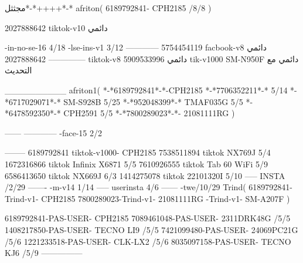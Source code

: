 مجثثل*-*++++*-*
afriton(
6189792841- CPH2185  /8/8
)

2027888642 tiktok-v10
دائمي

-in-no-se-16 4/18
-lse-ins-v1 3/12
------------
5754454119 facbook-v8
دائمي
--------------
2027888642 tiktok-v8
دائمي
5909533996 tik-v1000  SM-N950F
دائمي مع التحديث

__________
afriton1(
*-*6189792841*-*-CPH2185
*-*7706352211*-* 5/14
*-*6717029071*-*  SM-S928B 5/25
*-*952048399*-* TMAF035G 5/5
*-*6478592350*-* CPH2591 5/5
*-*7800289023*-*- 21081111RG \5\7
)


------
------------
-face-15 2/2

--------
6189792841 tiktok-v1000- CPH2185 
7538511894 tiktok NX769J  5/4
1672316866 tiktok Infinix X6871  5/5
7610926555 tiktok Tab 60 WiFi  5/9
6586413650 tiktok NX669J  6/3
1414275078 tiktok 22101320I  5/10
-----
 INSTA /2/29
-------
-m-v14 1/14
-----
userinsta 4/6
------
-twe/10/29
Trind(
6189792841-Trind-v1- CPH2185 
7800289023-Trind-v1- 21081111RG \5-Trind-v1- SM-A207F \5\9
)

6189792841-PAS-USER- CPH2185 
7089461048-PAS-USER- 2311DRK48G /5/5
1408217850-PAS-USER- TECNO LI9 /5/5
7421099480-PAS-USER- 24069PC21G /5/6
1221233518-PAS-USER- CLK-LX2 /5/6
8035097158-PAS-USER- TECNO KJ6  /5/9
    ---------------

